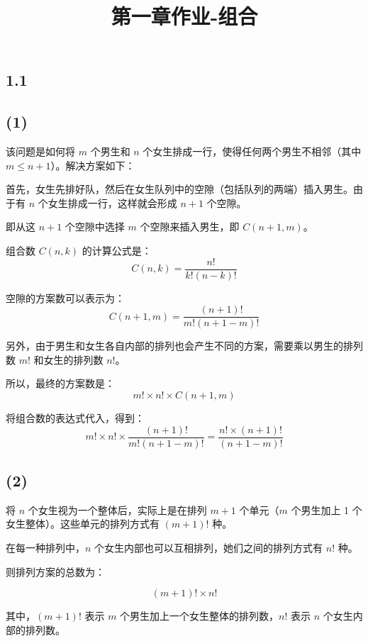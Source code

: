 \documentclass{article}
\title{第一章作业-组合}
\begin{document}
\begin{CJK}{UTF8}{gbsn}
\date{}


\maketitle

\section*{1.1}

\subsection*{(1)} 

该问题是如何将 \( m \) 个男生和 \( n \) 个女生排成一行，使得任何两个男生不相邻（其中 \( m \leq n + 1 \)）。解决方案如下：

首先，女生先排好队，然后在女生队列中的空隙（包括队列的两端）插入男生。由于有 \( n \) 个女生排成一行，这样就会形成 \( n + 1 \) 个空隙。

即从这 \( n + 1 \) 个空隙中选择 \( m \) 个空隙来插入男生，即 \( C(n+1, m) \)。

组合数 \( C(n, k) \) 的计算公式是：
\[
C(n, k) = \frac{n!}{k!(n-k)!}
\]

空隙的方案数可以表示为：
\[
C(n+1, m) = \frac{(n+1)!}{m!(n+1-m)!}
\]

另外，由于男生和女生各自内部的排列也会产生不同的方案，需要乘以男生的排列数 \( m! \) 和女生的排列数 \( n! \)。

所以，最终的方案数是：
\[
m! \times n! \times C(n+1, m)
\]

将组合数的表达式代入，得到：
\[
m! \times n! \times \frac{(n+1)!}{m!(n+1-m)!} = \frac{n! \times (n+1)!}{(n+1-m)!}
\]

\subsection*{(2)} 

将 \( n \) 个女生视为一个整体后，实际上是在排列 \( m+1 \) 个单元（\( m \) 个男生加上 1 个女生整体）。这些单元的排列方式有 \( (m+1)! \) 种。

在每一种排列中，\( n \) 个女生内部也可以互相排列，她们之间的排列方式有 \( n! \) 种。

则排列方案的总数为：

\[
(m + 1)! \times n!
\]

其中，\( (m + 1)! \) 表示 \( m \) 个男生加上一个女生整体的排列数，\( n! \) 表示 \( n \) 个女生内部的排列数。


\end{CJK}
\end{document}
